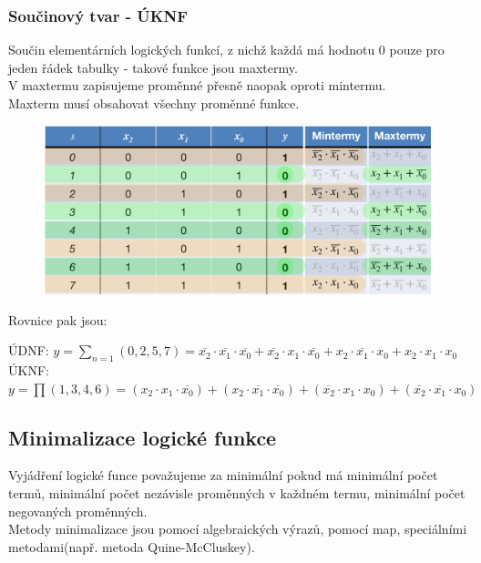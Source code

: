 \subsubsection{Součinový tvar - ÚKNF}
Součin elementárních logických funkcí, z nichž každá má hodnotu 0 pouze pro jeden řádek tabulky - takové funkce jsou maxtermy.\\
V maxtermu zapisujeme proměnné přesně naopak oproti mintermu.\\
Maxterm musí obsahovat všechny proměnné funkce.\\
\newpage
\begin{figure}
    \centering
    \includegraphics*[scale = 0.4]{img/Tvary.png}
\end{figure}
Rovnice pak jsou:
\begin{center}
    ÚDNF: \(y=\sum_{n = 1}(0,2,5,7)= \overline{x_2} \cdot \overline{x_1} \cdot \overline{x_0} + \overline{x_2} \cdot x_1 \cdot \overline{x_0} + x_2 \cdot \overline{x_1} \cdot x_0 + x_2 \cdot x_1 \cdot x_0 \)\\
    ÚKNF: \(y = \prod (1,3,4,6) = (x_2 \cdot x_1 \cdot \overline{x_0}) + (x_2 \cdot \overline{x_1} \cdot \overline{x_0}) + (\overline{x_2} \cdot x_1 \cdot x_0) + (\overline{x_2} \cdot \overline{x_1} \cdot x_0)\)
\end{center}
\subsection{Minimalizace logické funkce}
Vyjádření logické funce považujeme za minimální pokud má minimální počet termů, minimální počet nezávisle proměnných v každném termu, minimální počet negovaných proměnných.\\
Metody minimalizace jsou pomocí algebraických výrazů, pomocí map, speciálními metodami(např. metoda Quine-McCluskey).\\
